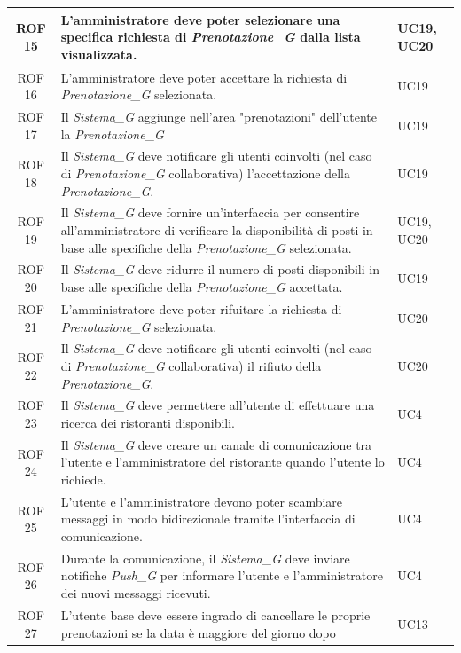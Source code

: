 \documentclass[12pt, oneside]{article}
\begin{document}
\begin{longtable}{|c|p{14cm}|p{2cm}|}
    \hline
    ROF 15 & L'amministratore deve poter selezionare una specifica richiesta di \textit{Prenotazione_G} dalla lista visualizzata. & UC19, UC20 \\
    \hline
    ROF 16 & L'amministratore deve poter accettare la richiesta di \textit{Prenotazione_G} selezionata. & UC19 \\
    \hline
    ROF 17 & Il \textit{Sistema_G} aggiunge nell'area "prenotazioni" dell'utente la \textit{Prenotazione_G} & UC19 \\
    \hline
    ROF 18 & Il \textit{Sistema_G} deve notificare gli utenti coinvolti (nel caso di \textit{Prenotazione_G} collaborativa) l'accettazione della \textit{Prenotazione_G}. & UC19 \\
    \hline
    ROF 19 & Il \textit{Sistema_G} deve fornire un'interfaccia per consentire all'amministratore di verificare la disponibilità di posti in base alle specifiche della \textit{Prenotazione_G} selezionata. & UC19, UC20 \\
    \hline
    ROF 20 & Il \textit{Sistema_G} deve ridurre il numero di posti disponibili in base alle specifiche della \textit{Prenotazione_G} accettata. & UC19 \\
    \hline
    ROF 21 & L'amministratore deve poter rifuitare la richiesta di \textit{Prenotazione_G} selezionata. & UC20 \\
    \hline
    ROF 22 & Il \textit{Sistema_G} deve notificare gli utenti coinvolti (nel caso di \textit{Prenotazione_G} collaborativa) il rifiuto della \textit{Prenotazione_G}. & UC20 \\
    \hline
    ROF 23 & Il \textit{Sistema_G} deve permettere all'utente di effettuare una ricerca dei ristoranti disponibili. & UC4 \\
    \hline
    ROF 24 & Il \textit{Sistema_G} deve creare un canale di comunicazione tra l'utente e l'amministratore del ristorante quando l'utente lo richiede. & UC4 \\
    \hline
    ROF 25 & L'utente e l'amministratore devono poter scambiare messaggi in modo bidirezionale tramite l'interfaccia di comunicazione. & UC4 \\
    \hline
    ROF 26 & Durante la comunicazione, il \textit{Sistema_G} deve inviare notifiche \textit{Push_G} per informare l'utente e l'amministratore dei nuovi messaggi ricevuti. & UC4 \\
    \hline
    ROF 27 & L'utente base deve essere ingrado di cancellare le proprie prenotazioni se la data è maggiore del giorno dopo & UC13 \\ 

\end{longtable}
\end{document}
